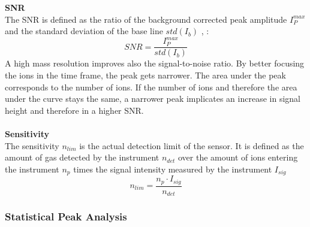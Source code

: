 	\textbf{SNR}\\ %
	The SNR is defined as the ratio of the background corrected peak amplitude $I^{max}_P$ and the standard deviation of the base line $std(I_b)$ \cite{Agilent_TechNote_SNR}, \cite{Master_Meyer}: %
	\begin{equation}
		SNR = \frac{I^{max}_P}{std(I_b)}
		\label{eq:SNR}
	\end{equation}
	A high mass resolution improves also the signal-to-noise ratio. By better focusing the ions in the time frame, the peak gets narrower. The area under the peak corresponds to the number of ions. If the number of ions and therefore the area under the curve stays the same, a narrower peak implicates an increase in signal height and therefore in a higher SNR.\\ %
	\\
	\textbf{Sensitivity} \\ %
	The sensitivity $n_{lim}$ is the actual detection limit of the sensor. It is defined as the amount of gas detected by the instrument $n_{det}$ over the amount of ions entering the instrument $n_{p}$ times the signal intensity measured by the instrument $I_{sig}$
	\begin{equation}
		n_{lim} = \frac{n_p \cdot I_{sig}}{n_{det}}
	\end{equation}
	
	

	

	
	
	
	\subsubsection{Statistical Peak Analysis}
	

